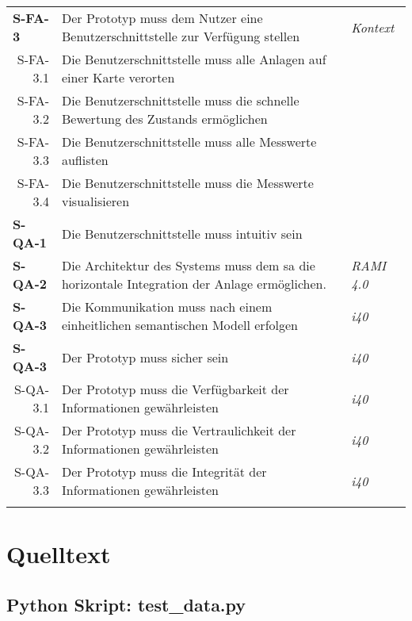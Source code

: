 \begin{tabularx}{\textwidth}{@{}lXp{2cm}@{}}
      \textbf{S-FA-3}              &  Der Prototyp muss dem Nutzer eine Benutzerschnittstelle zur Verfügung stellen    & \textit{Kontext}  \\
      \multicolumn{1}{r}{S-FA-3.1} &  Die Benutzerschnittstelle muss alle Anlagen auf einer Karte verorten \\
      \multicolumn{1}{r}{S-FA-3.2} &  Die Benutzerschnittstelle muss die schnelle Bewertung des Zustands ermöglichen \\
      \multicolumn{1}{r}{S-FA-3.3} &  Die Benutzerschnittstelle muss alle Messwerte auflisten \\
      \multicolumn{1}{r}{S-FA-3.4} &  Die Benutzerschnittstelle muss die Messwerte visualisieren \\
      \textbf{S-QA-1}              & Die Benutzerschnittstelle muss intuitiv sein   \\
      \textbf{S-QA-2}              & Die Architektur des Systems muss dem \ac{sa} die horizontale Integration der Anlage ermöglichen.   & \textit{RAMI 4.0} \\
      \textbf{S-QA-3}              &  Die Kommunikation muss nach einem einheitlichen semantischen Modell erfolgen  & \textit{\ac{i40}} \\
      \textbf{S-QA-3}              &  Der Prototyp muss sicher sein  & \textit{\ac{i40}} \\
      \multicolumn{1}{r}{S-QA-3.1}              &  Der Prototyp muss die Verfügbarkeit der Informationen gewährleisten  & \textit{\ac{i40}} \\
      \multicolumn{1}{r}{S-QA-3.2}              &  Der Prototyp muss die Vertraulichkeit der Informationen gewährleisten  & \textit{\ac{i40}} \\
      \multicolumn{1}{r}{S-QA-3.3}              &  Der Prototyp muss die Integrität der Informationen gewährleisten & \textit{\ac{i40}} \\
      \addlinespace
      \bottomrule
      \caption{Anforderungen aus Systemebene}
      \label{system_anforderungen}
  \end{tabularx}

\section{Quelltext}

\subsection{Python Skript: test\_data.py}


